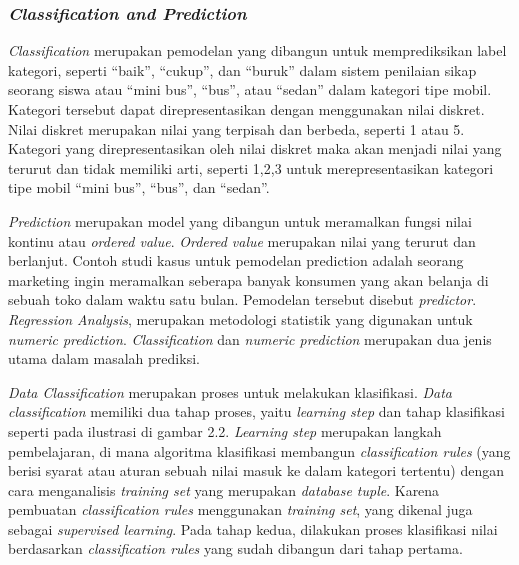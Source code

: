 \subsubsection{\textsl{Classification and Prediction}}
\textsl{Classification} merupakan pemodelan yang dibangun untuk memprediksikan label kategori, seperti "`baik"', "`cukup"', dan "`buruk"' dalam sistem penilaian sikap seorang siswa atau "`mini bus"', "`bus"', atau "`sedan"' dalam kategori tipe mobil. Kategori tersebut dapat direpresentasikan dengan menggunakan nilai diskret. Nilai diskret merupakan nilai yang terpisah dan berbeda, seperti 1 atau 5. Kategori yang direpresentasikan oleh nilai diskret maka akan menjadi nilai yang terurut dan tidak memiliki arti, seperti 1,2,3 untuk merepresentasikan kategori tipe mobil "`mini bus"', "`bus"', dan "`sedan"'.

\textsl{Prediction} merupakan model yang dibangun untuk meramalkan fungsi nilai kontinu atau \textsl{ordered value}. \textsl{Ordered value} merupakan nilai yang terurut dan berlanjut. Contoh studi kasus untuk pemodelan prediction adalah seorang marketing ingin meramalkan seberapa banyak konsumen yang akan belanja di sebuah toko dalam waktu satu bulan. Pemodelan tersebut disebut \textsl{predictor}. \textsl{Regression Analysis}, merupakan metodologi statistik yang digunakan untuk \textsl{numeric prediction}. \textsl{Classification} dan \textsl{numeric prediction} merupakan dua jenis utama dalam masalah prediksi.

\textsl{Data Classification} merupakan proses untuk melakukan klasifikasi. \textsl{Data classification} memiliki dua tahap proses, yaitu \textsl{learning step} dan tahap klasifikasi seperti pada ilustrasi di gambar 2.2. \textsl{Learning step} merupakan langkah pembelajaran, di mana algoritma klasifikasi membangun \textsl{classification rules} (yang berisi syarat atau aturan sebuah nilai masuk ke dalam kategori tertentu) dengan cara menganalisis \textsl{training set} yang merupakan \textsl{database tuple}. Karena pembuatan \textsl{classification rules} menggunakan \textsl{training set}, yang dikenal juga sebagai \textsl{supervised learning}. 
Pada tahap kedua, dilakukan proses klasifikasi nilai berdasarkan \textsl{classification rules} yang sudah dibangun dari tahap pertama.

